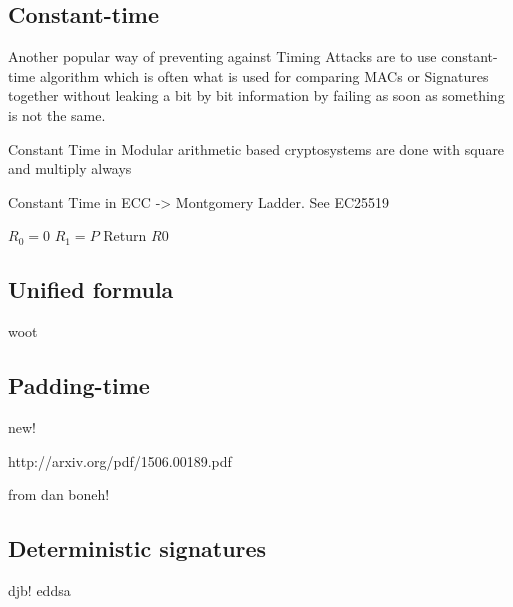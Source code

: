 \documentclass[a4paper,11pt]{article}
\begin{document}
\subsection{Constant-time}

Another popular way of preventing against Timing Attacks are to use constant-time algorithm which is often what is used for comparing MACs or Signatures together without leaking a bit by bit information by failing as soon as something is not the same.

Constant Time in Modular arithmetic based cryptosystems are done with square and multiply always

\begin{algorithm}
\end{algorithm}

Constant Time in ECC -> Montgomery Ladder. See EC25519

\begin{algorithm}
    $R_0 = 0$\;
    $R_1 = P$\;
    Return $R0$\;
\end{algorithm}

\subsection{Unified formula}

woot

\subsection{Padding-time}

new! 

http://arxiv.org/pdf/1506.00189.pdf

from dan boneh!

\subsection{Deterministic signatures}

djb! eddsa
\end{document}
